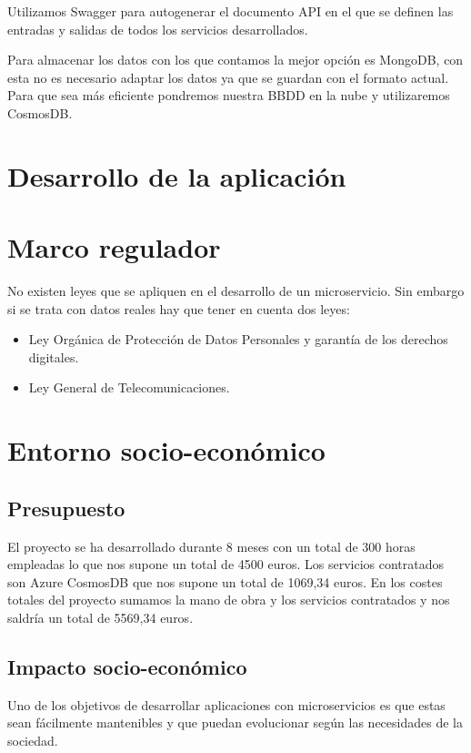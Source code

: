 \documentclass[12pt]{report} %
\begin{document}
	Utilizamos Swagger para autogenerar el documento API en el que se definen las entradas y salidas de todos los servicios desarrollados.
	
	Para almacenar los datos con los que contamos la mejor opción es MongoDB, con esta no es necesario adaptar los datos ya que se guardan con el formato actual. Para que sea más eficiente pondremos nuestra BBDD en la nube y utilizaremos CosmosDB.
	
	
	\section{Desarrollo de la aplicación}
	
	\section{Marco regulador}
	
	No existen leyes que se apliquen en el desarrollo de un microservicio. Sin embargo si se trata con datos reales hay que tener en cuenta dos leyes:
	\begin{itemize}
		\item Ley Orgánica de Protección de Datos Personales y garantía de los derechos digitales.
		\item Ley General de Telecomunicaciones.
	\end{itemize}
	
	
	\section{Entorno socio-económico}	
	
	\subsection{Presupuesto}
	
	
	El proyecto se ha desarrollado durante 8 meses con un total de 300 horas empleadas lo que nos supone un total de 4500 euros. 
	Los servicios contratados son Azure CosmosDB que nos supone un total de 1069,34 euros.
	En los costes totales del proyecto sumamos la mano de obra y los servicios contratados y nos saldría un total de 5569,34 euros.
	
	
	\subsection{Impacto socio-económico}
	
	Uno de los objetivos de desarrollar aplicaciones con microservicios es que estas sean fácilmente mantenibles y que puedan evolucionar según las necesidades de la sociedad.
	
\end{document}
